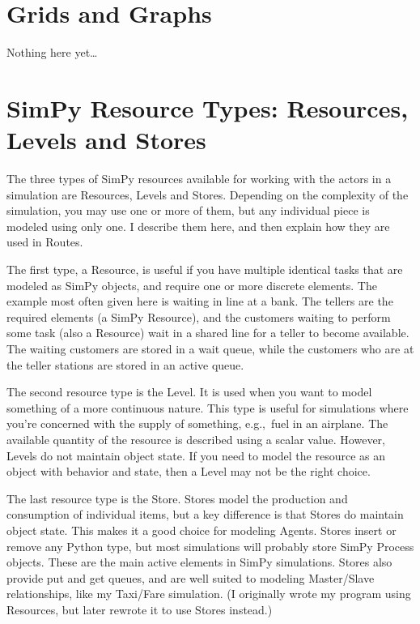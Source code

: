 \documentclass[11pt,letterpaper,onecolumn,twoside,openright,final]{report}
\begin{document}
\section{Grids and Graphs}
Nothing here yet\ldots


\section{SimPy Resource Types: Resources, Levels and Stores}
The three types of SimPy resources available for working with the actors in a simulation are Resources, Levels and Stores.
Depending on the complexity of the simulation, you may use one or more of them, but any individual piece is modeled using only one.
I describe them here, and then explain how they are used in Routes.

The first type, a Resource, is useful if you have multiple identical tasks that are modeled as SimPy objects, and require one or more discrete elements.
The example most often given here is waiting in line at a bank.
The tellers are the required elements (a SimPy Resource), and the customers waiting to perform some task (also a Resource) wait in a shared line for a teller to become available.
The waiting customers are stored in a wait queue, while the customers who are at the teller stations are stored in an active queue.

The second resource type is the Level.
It is used when you want to model something of a more continuous nature.
This type is useful for simulations where you're concerned with the supply of something, e.g.,~fuel in an airplane.
The available quantity of the resource is described using a scalar value.
However, Levels do not maintain object state.
If you need to model the resource as an object with behavior and state, then a Level may not be the right choice.

The last resource type is the Store.
Stores model the production and consumption of individual items, but a key difference is that Stores do maintain object state.
This makes it a good choice for modeling Agents.
Stores insert or remove any Python type, but most simulations will probably store SimPy Process objects.
These are the main active elements in SimPy simulations.
Stores also provide put and get queues, and are well suited to modeling Master/Slave relationships, like my Taxi/Fare simulation.
(I originally wrote my program using Resources, but later rewrote it to use Stores instead.)
\end{document}
